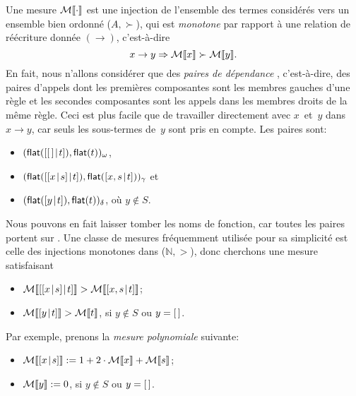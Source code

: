 Une mesure \(\mathcal{M}\llbracket{\cdot}\rrbracket\) est une injection de l'ensemble des
termes considérés vers un ensemble bien ordonné (\(A,\succ\)), qui est
\emph{monotone} par rapport à une relation de réécriture donnée
\((\rightarrow)\), c'est-à-dire
\begin{equation*}
  x \rightarrow y \Rightarrow \mathcal{M}\llbracket{x}\rrbracket \succ \mathcal{M}\llbracket{y}\rrbracket.
\end{equation*}
En fait, nous n'allons considérer que des \emph{paires de dépendance}
\citep{ArtsGiesl_2000},
c'est-à-dire, des paires d'appels dont les premières composantes sont
les membres gauches d'une règle et les secondes composantes sont les
appels dans les membres droits de la même règle. Ceci est plus facile
que de travailler directement avec \(x\)~et~\(y\) dans \(x \rightarrow
y\), car seuls les sous-termes de~\(y\) sont pris en compte. Les
paires sont:
\begin{itemize}

  \item \((\textsf{flat}([{[\,]}\!\mid\!{t}]), \textsf{flat}(t))_\omega\),

  \item \((\textsf{flat}([{[{x}\!\mid\!{s}]}\!\mid\!{t}]),
    \textsf{flat}([{x,s}\!\mid\!{t}]))_\gamma\) et

  \item \((\textsf{flat}([{y}\!\mid\!{t}]), \textsf{flat}(t))_\delta\), où \(y
    \not\in S\).
\end{itemize}
Nous pouvons en fait laisser tomber les noms de fonction, car toutes
les paires portent sur . Une
classe de mesures fréquemment utilisée pour sa simplicité est celle
des injections monotones dans (\(\mathbb{N},>\)), donc cherchons une
mesure satisfaisant
\begin{itemize}

  \item \(\mathcal{M}\llbracket{[{[{x}\!\mid\!{s}]}\!\mid\!{t}]}\rrbracket > \mathcal{M}\llbracket{[{x,s}\!\mid\!{t}]}\rrbracket\);

  \item \(\mathcal{M}\llbracket{[{y}\!\mid\!{t}]}\rrbracket > \mathcal{M}\llbracket{t}\rrbracket\), si \(y \not\in S\) ou
    \(y=[\,]\).

\end{itemize}
Par exemple, prenons la \emph{mesure polynomiale} suivante:
\begin{itemize}

  \item \(\mathcal{M}\llbracket{[{x}\!\mid\!{s}]}\rrbracket := 1 + 2\cdot\mathcal{M}\llbracket{x}\rrbracket +
    \mathcal{M}\llbracket{s}\rrbracket\);

  \item \(\mathcal{M}\llbracket{y}\rrbracket := 0\), si \(y \not\in S\) ou \(y=[\,]\).

\end{itemize}
